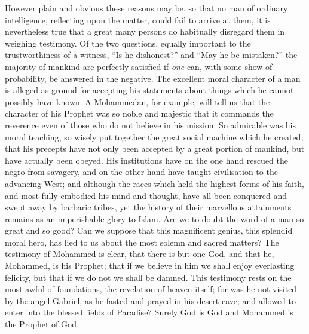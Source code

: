 \documentclass[12pt]{article}
\begin{document}
However plain and obvious these reasons may be, so that no man of ordinary intelligence, reflecting upon the matter, could fail to arrive at them, it is nevertheless true that a great many persons do habitually disregard them in weighing testimony. Of the two questions, equally important to the trustworthiness of a witness, ``Is he dishonest?'' and ``May he be mistaken?'' the majority of mankind are perfectly satisfied if \emph{one} can, with some show of probability, be answered in the negative. The excellent moral character of a man is alleged as ground for accepting his statements about things which he cannot possibly have known. A Mohammedan, for example, will tell us that the character of his Prophet was so noble and majestic that it commands the reverence even of those who do not believe in his mission. So admirable was his moral teaching, so wisely put together the great social machine which he created, that his precepts have not only been accepted by a great portion of mankind, but have actually been obeyed. His institutions have on the one hand rescued the negro from savagery, and on the other hand have taught civilisation to the advancing West; and although the races which held the highest forms of his faith, and most fully embodied his mind and thought, have all been conquered and swept away by barbaric tribes, yet the history of their marvellous attainments remains as an imperishable glory to Islam. Are we to doubt the word of a man so great and so good? Can we suppose that this magnificent genius, this splendid moral hero, has lied to us about the most solemn and sacred matters? The testimony of Mohammed is clear, that there is but one God, and that he, Mohammed, is his Prophet; that if we believe in him we shall enjoy everlasting felicity, but that if we do not we shall be damned. This testimony rests on the most awful of foundations, the revelation of heaven itself; for was he not visited by the angel Gabriel, as he fasted and prayed in his desert cave; and allowed to enter into the blessed fields of Paradise? Surely God is God and Mohammed is the Prophet of God.
\end{document}
